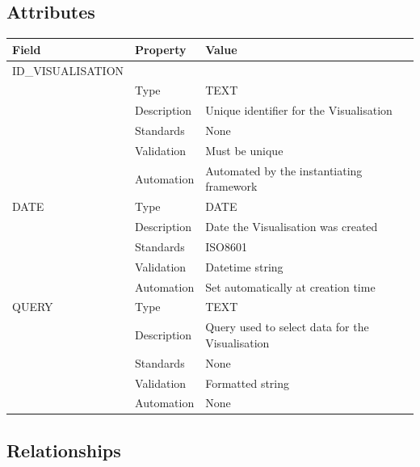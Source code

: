 \subsection{Attributes}\label{attributes-35}

\begin{longtable}[]{@{}lll@{}}
\toprule\noalign{}
Field & Property & Value \\
\midrule\noalign{}
\endhead
\bottomrule\noalign{}
\endlastfoot
ID\_VISUALISATION & & \\
& Type & TEXT \\
& Description & Unique identifier for the Visualisation \\
& Standards & None \\
& Validation & Must be unique \\
& Automation & Automated by the instantiating framework \\
DATE & Type & DATE \\
& Description & Date the Visualisation was created \\
& Standards & ISO8601 \\
& Validation & Datetime string \\
& Automation & Set automatically at creation time \\
QUERY & Type & TEXT \\
& Description & Query used to select data for the Visualisation \\
& Standards & None \\
& Validation & Formatted string \\
& Automation & None \\
\end{longtable}

\subsection{Relationships}\label{relationships-33}

